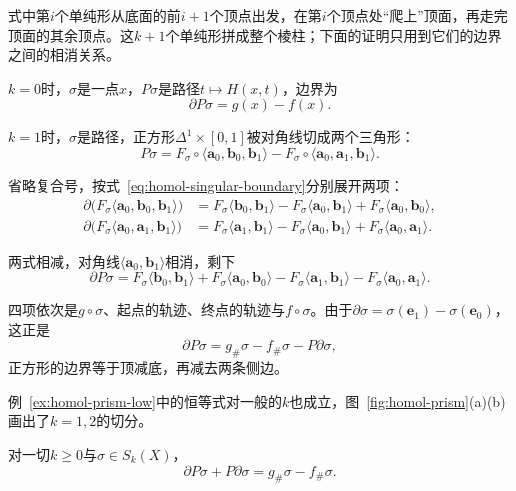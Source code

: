 式中第$i$个单纯形从底面的前$i+1$个顶点出发，在第$i$个顶点处“爬上”顶面，再走完顶面的其余顶点。这$k+1$个单纯形拼成整个棱柱；下面的证明只用到它们的边界之间的相消关系。

\begin{example}[低维的棱柱]
\label{ex:homol-prism-low}
$k=0$时，$\sigma$是一点$x$，$P\sigma$是路径$t\mapsto H(x,t)$，边界为
\[
 \partial P\sigma=g(x)-f(x).
\]

$k=1$时，$\sigma$是路径，正方形$\Delta^1\times[0,1]$被对角线切成两个三角形：
\[
 P\sigma=F_\sigma\circ\langle\bm a_0,\bm b_0,\bm b_1\rangle-F_\sigma\circ\langle\bm a_0,\bm a_1,\bm b_1\rangle.
\]

省略复合号，按式~\eqref{eq:homol-singular-boundary}分别展开两项：
\begin{align*}
 \partial\bigl(F_\sigma\langle\bm a_0,\bm b_0,\bm b_1\rangle\bigr)&=F_\sigma\langle\bm b_0,\bm b_1\rangle-F_\sigma\langle\bm a_0,\bm b_1\rangle+F_\sigma\langle\bm a_0,\bm b_0\rangle,\\
 \partial\bigl(F_\sigma\langle\bm a_0,\bm a_1,\bm b_1\rangle\bigr)&=F_\sigma\langle\bm a_1,\bm b_1\rangle-F_\sigma\langle\bm a_0,\bm b_1\rangle+F_\sigma\langle\bm a_0,\bm a_1\rangle.
\end{align*}

两式相减，对角线$\langle\bm a_0,\bm b_1\rangle$相消，剩下
\[
 \partial P\sigma=F_\sigma\langle\bm b_0,\bm b_1\rangle+F_\sigma\langle\bm a_0,\bm b_0\rangle-F_\sigma\langle\bm a_1,\bm b_1\rangle-F_\sigma\langle\bm a_0,\bm a_1\rangle.
\]

四项依次是$g\circ\sigma$、起点的轨迹、终点的轨迹与$f\circ\sigma$。由于$\partial\sigma=\sigma(\bm e_1)-\sigma(\bm e_0)$，这正是
\[
 \partial P\sigma=g_\#\sigma-f_\#\sigma-P\partial\sigma,
\]
正方形的边界等于顶减底，再减去两条侧边。
\end{example}

例~\ref{ex:homol-prism-low}中的恒等式对一般的$k$也成立，图~\ref{fig:homol-prism}(a)(b)画出了$k=1,2$的切分。

\begin{lemma}[棱柱恒等式]
\label{lem:homol-prism-identity}
对一切$k\geq0$与$\sigma\in S_k(X)$，
\begin{equation}
 \partial P\sigma+P\partial\sigma=g_\#\sigma-f_\#\sigma.
 \label{eq:homol-prism-identity}
\end{equation}
\end{lemma}

